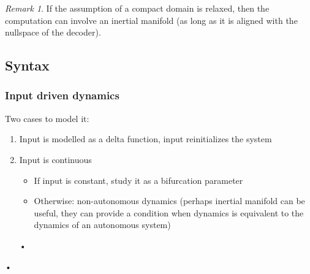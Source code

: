 \documentclass{scrartcl}
\theoremstyle{definition}
\theoremstyle{remark}
\newtheorem{remark}{Remark}
\begin{document}
\begin{remark}
If the assumption of a compact domain is relaxed, then the computation can involve an inertial manifold (as long as it is aligned with the nullspace of the decoder).
\end{remark}


\subsection{Syntax}%

\subsubsection{Input driven dynamics}
Two cases to model it:
\begin{enumerate}
\item Input is modelled as a delta function, input reinitializes the system
\item Input is continuous 
\begin{itemize}
\item If input is constant, study it as a bifurcation parameter
\item Otherwise: non-autonomous dynamics (perhaps inertial manifold can be useful, they can provide a condition when dynamics is equivalent to the dynamics of an autonomous system)
\end{itemize}•
\end{enumerate}•




% 
% 
\end{document}
